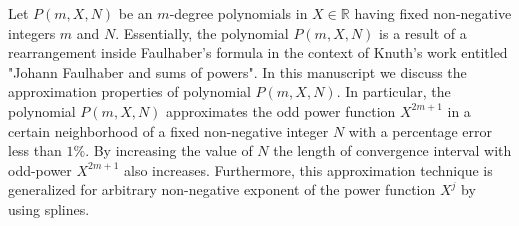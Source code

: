 Let $P(m, X, N)$ be an $m$-degree polynomials in $X\in\mathbb{R}$
having fixed non-negative integers $m$ and $N$.
Essentially, the polynomial $P(m, X, N)$ is a result of a rearrangement inside Faulhaber's formula
in the context of Knuth's work entitled "Johann Faulhaber and sums of powers".
In this manuscript we discuss the approximation properties of polynomial $P(m,X,N)$.
In particular, the polynomial $P(m,X,N)$ approximates the odd power function $X^{2m+1}$ in a certain neighborhood
of a fixed non-negative integer $N$ with a percentage error less than $1\%$.
By increasing the value of $N$ the length of convergence interval with odd-power $X^{2m+1}$ also increases.
Furthermore, this approximation technique is generalized for arbitrary non-negative exponent of the power function $X^j$
by using splines.

